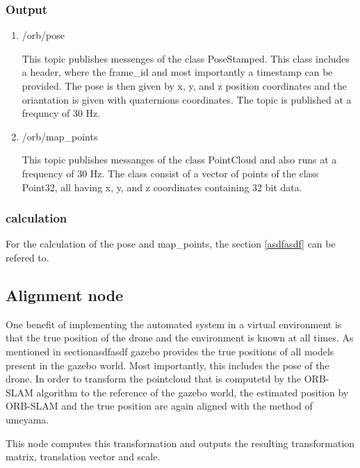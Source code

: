     \subsubsection{Output}
	
	\begin{enumerate}
	\item{/orb/pose}
	
	This topic publishes messenges of the class PoseStamped. This class includes a header, where the frame\_id and most importantly a timestamp can be provided. 
	The pose is then given by x, y, and z position coordinates and the oriantation is given with quaternions coordinates. %
	The topic is published at a frequncy of 30 Hz. 
	
	\item{/orb/map\_points}
	
	This topic publishes messanges of the class PointCloud and also runs at a frequency of 30 Hz. The class consist of a vector of points of the 
	class Point32, all having x, y, and z coordinates containing 32 bit data. 
	 

	\end{enumerate}
	
	\subsubsection{calculation}
	
	For the calculation of the pose and map\_points, the section \ref{asdfasdf} can be refered to. 
	

	
	\subsection{Alignment node}
	
	One benefit of implementing the automated system in a virtual environment is that the true position of the drone and the environment is known at 
	all times. As mentioned in section{asdfasdf} gazebo provides the true positions of all models present in the gazebo world. Most importantly, this includes 
	the pose of the drone. In order to transform the pointcloud that is computetd by the ORB-SLAM algorithm to the reference of the gazebo world, the estimated 
	position by ORB-SLAM and the true position are again aligned with the method of umeyama. 
	
	This node computes this transformation and outputs the resulting transformation matrix, translation vector and scale. 
	
